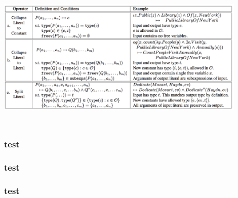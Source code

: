 \documentclass{beamer}
\begin{document}
\begin{frame}
     {
        \begin{center}
            \includegraphics[width=12cm,height=7cm]{img/ontology-match-ops.png}
        \end{center}
    }
\end{frame}

\begin{frame}
    \frametitle{test}
\end{frame}

\begin{frame}
    \frametitle{test}
\end{frame}

\begin{frame}
    \frametitle{test}
\end{frame}
\end{document}
